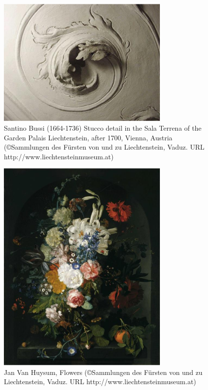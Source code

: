 \documentclass[%
 reprint,
 showpacs,
 showkeys,
 amsmath,
 amssymb,
 aps,
 pra,
 longbibliography,
 floatfix,
 ]{revtex4-1}
\begin{document}









\begin{figure}
\centerline{\includegraphics[width=8.5cm]{2008-ae-bospiral}}
   \caption{Santino Bussi (1664-1736) Stucco detail in the Sala Terrena of the Garden Palais
 Liechtenstein, after 1700, Vienna, Austria
(\copyright Sammlungen des F\"ursten von und zu Liechtenstein, Vaduz.
URL http://www.liechtensteinmuseum.at)}
   \label{2005-ae-bospiral}
 \end{figure}
\begin{figure}
\centerline{\includegraphics[width=8.5cm]{2008-ae-JanVanHuysum_Blumenstrauss}}
   \caption{Jan Van Huysum, Flowers
(\copyright Sammlungen des F\"ursten von und zu Liechtenstein, Vaduz.
URL http://www.liechtensteinmuseum.at)}
   \label{2005-ae-JanVanHuysum_Blumenstrauss}
 \end{figure}
\end{document}
